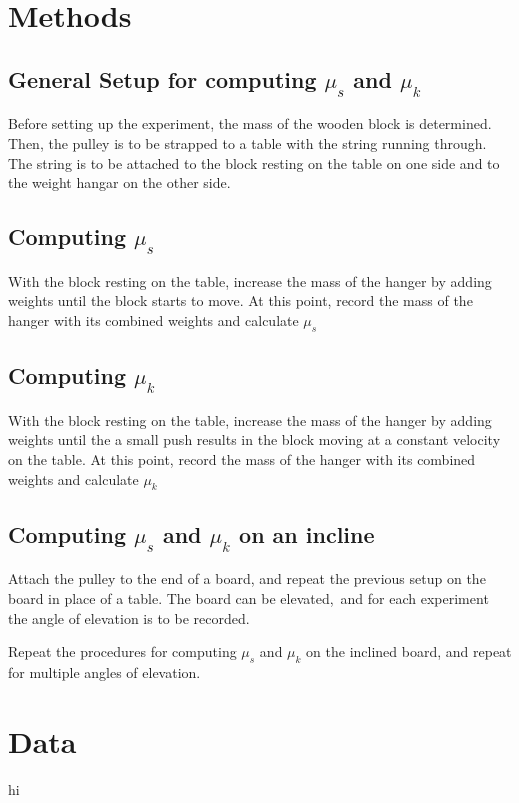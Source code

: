 \documentclass[12pt]{article}
\begin{document}
    \section{Methods}
        \subsection{General Setup for computing $\mu_s$ and $\mu_k$}
            Before setting up the experiment, the mass of the wooden block is 
            determined. Then, the pulley is to be strapped to a table with the
            string running through. The string is to be attached to the block
            resting on the table on one side and to the weight hangar on the 
            other side.
        \subsection{Computing $\mu_s$}
            With the block resting on the table, increase the mass of
            the hanger by adding weights until the block starts to move.
            At this point, record the mass of the hanger with its combined 
            weights and calculate $\mu_s$
        \subsection{Computing $\mu_k$}
            With the block resting on the table, increase the mass of
            the hanger by adding weights until the a small push results
            in the block moving at a constant velocity on the table.
            At this point, record the mass of the hanger with its combined 
            weights and calculate $\mu_k$
        \subsection{Computing $\mu_s$ and $\mu_k$ on an incline}
            \par Attach the pulley to the end of a board, and repeat the previous 
            setup on the board in place of a table. The board can be elevated,\
            and for each experiment the angle of elevation is to be recorded.
            \par Repeat the procedures for computing $\mu_s$ and $\mu_k$ on the
            inclined board, and repeat for multiple angles of elevation.
    \section{Data}
       hi
\end{document}
